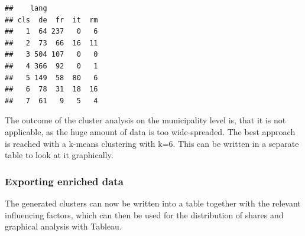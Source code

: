 \documentclass[
]{article}
\begin{document}
\begin{verbatim}
##    lang
## cls  de  fr  it  rm
##   1  64 237   0   6
##   2  73  66  16  11
##   3 504 107   0   0
##   4 366  92   0   1
##   5 149  58  80   6
##   6  78  31  18  16
##   7  61   9   5   4
\end{verbatim}

The outcome of the cluster analysis on the municipality level is, that
it is not applicable, as the huge amount of data is too wide-spreaded.
The best approach is reached with a k-means clustering with k=6. This
can be written in a separate table to look at it graphically.

\hypertarget{exporting-enriched-data}{%
\subsubsection{Exporting enriched data}\label{exporting-enriched-data}}

The generated clusters can now be written into a table together with the
relevant influencing factors, which can then be used for the
distribution of shares and graphical analysis with Tableau.
\end{document}
